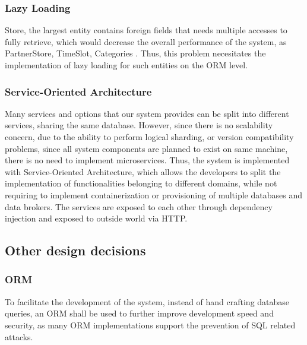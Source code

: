 \subsubsection{Lazy Loading}
Store, the largest entity contains foreign fields that needs multiple accesses to fully retrieve, which would decrease the overall performance of the system, as PartnerStore, TimeSlot, Categories .
Thus, this problem necesitates the implementation of lazy loading for such entities on the ORM level.

\subsubsection{Service-Oriented Architecture}


Many services and options that our system provides can be split into different services, sharing the same database.
However, since there is no scalability concern, due to the ability to perform logical sharding, or version compatibility problems, since all system components are planned to exist on same machine, there is no need to implement microservices.
Thus, the system is implemented with Service-Oriented Architecture, which allows the developers to split the implementation of functionalities belonging to different domains, while not requiring to implement containerization or provisioning of multiple databases and data brokers.
The services are exposed to each other through dependency injection and exposed to outside world via HTTP.

\subsection{Other design decisions} %
\subsubsection{ORM}

To facilitate the development of the system, instead of hand crafting database queries, an ORM shall be used to further improve development speed and security, as many ORM implementations support the prevention of SQL related attacks.


